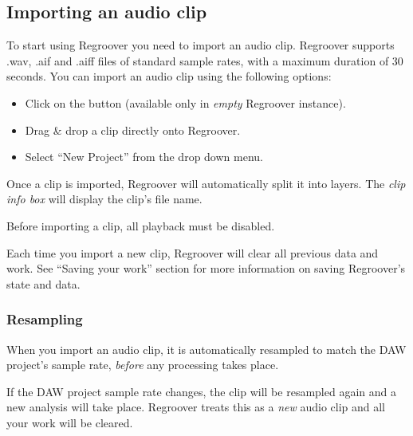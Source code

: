\documentclass[12pt]{article}
\newcommand{\textimage}[3]{
\raisebox{#1}{\texttt{[image: \#3]}}
}
\begin{document}
\subsection*{Importing an audio clip}
To start using Regroover you need to import an audio clip. Regroover supports .wav, .aif and .aiff files of standard sample rates, with a maximum duration of 30 seconds. You can import an audio clip using the following options:
\begin{itemize}
\item Click on the \textimage{-7pt}{0.8}{./images/select_clip2.png} button (available only in \textit{empty} Regroover instance).
\item Drag \& drop a clip directly onto Regroover.
\item Select ``New Project'' from the \textimage{-7pt}{0.8}{./images/project_button.png} drop down menu.
\end{itemize}
Once a clip is imported, Regroover will automatically split it into layers.  The \textit{clip info box} will display the clip’s file name.
\begin{mdframed}[style = warning]
Before importing a clip, all playback must be disabled. 
\end{mdframed}
\begin{mdframed}[style = warning]
Each time you import a new clip, Regroover will clear all previous data and work. See ``Saving your work'' section for more information on saving Regroover's state and data.
\end{mdframed}

\subsubsection*{Resampling}
When you import an audio clip, it is automatically resampled to match the DAW project's sample rate, \textit{before} any processing takes place. 
\begin{mdframed}[style = warning]
If the DAW project sample rate changes, the clip will be resampled again and a new analysis will take place. Regroover treats this as a \textit{new} audio clip and all your work will be cleared.
\end{mdframed}
\end{document}
